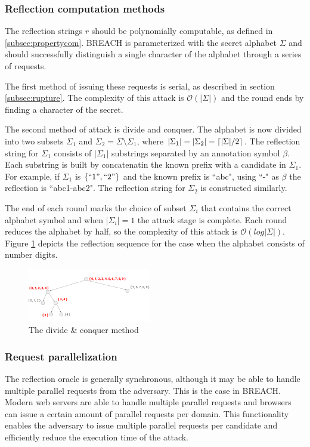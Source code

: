 \subsubsection{Reflection computation methods}\label{subsec:reflectionmethods}
The reflection strings $r$ should be polynomially computable, as defined in
\ref{subsec:propertycom}. BREACH is parameterized with the secret alphabet
$\Sigma$ and should successfully distinguish a single character of the alphabet
through a series of requests.

The first method of issuing these requests is serial, as described in section
\ref{subsec:rupture}.  The complexity of this attack is $\mathcal{O}(|\Sigma|)$
and the round ends by finding a character of the secret.

The second method of attack is divide and conquer. The alphabet is now divided
into two subsets $\Sigma_1$ and $\Sigma_2 = \Sigma \setminus \Sigma_1$, where
$|\Sigma_1| = |\Sigma_2| = \lceil|\Sigma| / 2\rceil$. The reflection string for
$\Sigma_1$ consists of $|\Sigma_1|$ substrings separated by an annotation symbol
$\beta$. Each substring is built by concatenatin the known prefix with a
candidate in $\Sigma_1$. For example, if $\Sigma_1$ is $\{``1", ``2"\}$ and the
known prefix is ``abc", using ``-" as $\beta$ the reflection is ``abc1-abc2".
The reflection string for $\Sigma_2$ is constructed similarly.

The end of each round marks the choice of subset $\Sigma_i$ that contains the
correct alphabet symbol and when $|\Sigma_i| = 1$ the attack stage is complete.
Each round reduces the alphabet by half, so the complexity of this attack is
$\mathcal{O}(log|\Sigma|)$. Figure \ref{fig:divide_and_conquer} depicts the
reflection sequence for the case when the alphabet consists of number digits.

   \begin{figure}[thpb]
      \centering
          \includegraphics[width=0.48\textwidth]{figures/divide_and_conquer.png}
      \caption{The divide \& conquer method}
      \label{fig:divide_and_conquer}
   \end{figure}

\subsubsection{Request parallelization}\label{subsec:parallel}
The reflection oracle is generally synchronous, although it may be able to
handle multiple parallel requests from the adversary.  This is the case in
BREACH. Modern web servers are able to handle multiple parallel requests and
browsers can issue a certain amount of parallel requests per domain. This
functionality enables the adversary to issue multiple parallel requests per
candidate and efficiently reduce the execution time of the attack.


